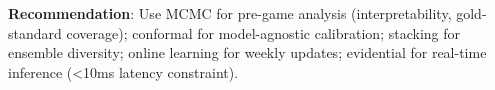 \begin{landscape}
\begin{table}[p]
\begin{threeparttable}
\begin{tablenotes}[flushleft]
\begin{itemize}[leftmargin=*, itemsep=1pt, parsep=0pt]
      \end{itemize}
    \item \textbf{Recommendation}: Use MCMC for pre-game analysis (interpretability, gold-standard coverage); conformal for model-agnostic calibration; stacking for ensemble diversity; online learning for weekly updates; evidential for real-time inference (<10ms latency constraint).
  \end{tablenotes}
  \end{threeparttable}
\end{table}
\end{landscape}

